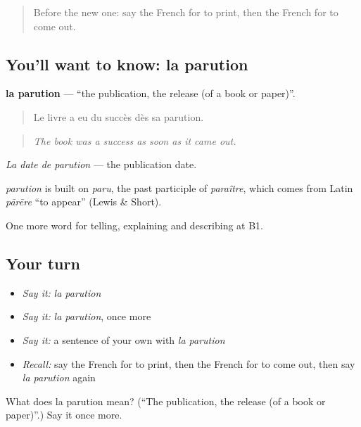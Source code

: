 \label{lesson:FR-C279-parution}



\begin{quote}
Before the new one: say the French for to print, then the French for to come out.
\end{quote}

\subsection*{You'll want to know: la parution}
\textbf{la parution} — \textquotedblleft{}the publication, the release (of a book or paper)\textquotedblright{}.

\begin{quote}
Le livre a eu du succès dès sa parution.
\end{quote}

\begin{quote}
\emph{The book was a success as soon as it came out.}
\end{quote}

\emph{La date de parution} — the publication date.

\begin{cousinweb}
\emph{parution} is built on \emph{paru}, the past participle of \emph{paraître}, which comes from Latin \emph{pārēre} \textquotedblleft{}to appear\textquotedblright{} (Lewis \& Short).
\end{cousinweb}

\begin{grammarlens}[title={What you've built}]
One more word for telling, explaining and describing at B1.
\end{grammarlens}

\subsection*{Your turn}
\begin{itemize}
\raggedright
  \item \emph{Say it:} \emph{la parution}
  \item \emph{Say it:} \emph{la parution}, once more
  \item \emph{Say it:} a sentence of your own with \emph{la parution}
  \item \emph{Recall:} say the French for to print, then the French for to come out, then say \emph{la parution} again
\end{itemize}

\begin{tcolorbox}[breakable,colback=teal!4,colframe=teal!35!black,title={Before you move on}]
What does la parution mean? (\textquotedblleft{}The publication, the release (of a book or paper)\textquotedblright{}.) Say it once more.
\end{tcolorbox}
